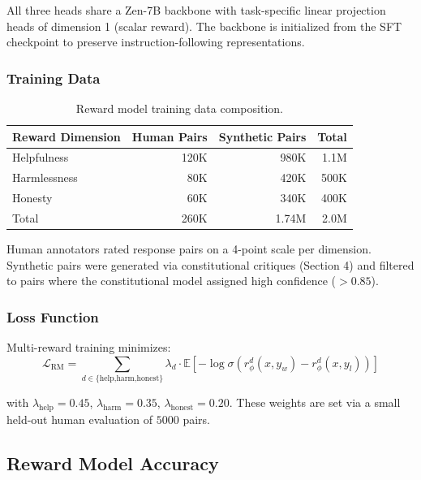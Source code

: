 \documentclass[11pt,a4paper]{article}
\begin{document}
All three heads share a Zen-7B backbone with task-specific linear projection heads
of dimension 1 (scalar reward). The backbone is initialized from the SFT checkpoint
to preserve instruction-following representations.

\subsubsection{Training Data}

\begin{table}[H]
\centering
\begin{tabular}{lrrr}
\toprule
\textbf{Reward Dimension} & \textbf{Human Pairs} & \textbf{Synthetic Pairs} & \textbf{Total} \\
\midrule
Helpfulness & 120K & 980K & 1.1M \\
Harmlessness & 80K & 420K & 500K \\
Honesty & 60K & 340K & 400K \\
\midrule
Total & 260K & 1.74M & 2.0M \\
\bottomrule
\end{tabular}
\caption{Reward model training data composition.}
\end{table}

Human annotators rated response pairs on a 4-point scale per dimension.
Synthetic pairs were generated via constitutional critiques (Section 4) and filtered
to pairs where the constitutional model assigned high confidence ($>0.85$).

\subsubsection{Loss Function}

Multi-reward training minimizes:
\begin{equation}
\mathcal{L}_\text{RM} = \sum_{d \in \{\text{help,harm,honest}\}} \lambda_d \cdot \mathbb{E}\left[-\log \sigma\left(r_\phi^d(x, y_w) - r_\phi^d(x, y_l)\right)\right]
\end{equation}

with $\lambda_\text{help} = 0.45$, $\lambda_\text{harm} = 0.35$, $\lambda_\text{honest} = 0.20$.
These weights are set via a small held-out human evaluation of $5000$ pairs.

\subsection{Reward Model Accuracy}
\end{document}
